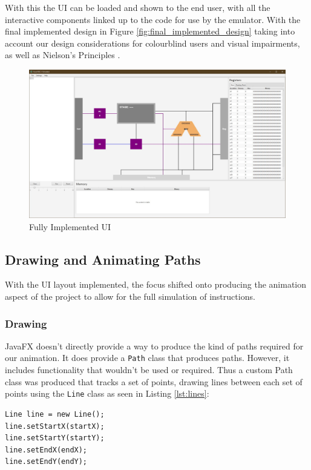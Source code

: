 With this the \ac{UI} can be loaded and shown to the end user, with all the interactive components linked up to the code for use by the emulator. With the final implemented design in Figure \ref{fig:final_implemented_design} taking into account our design considerations for colourblind users and visual impairments, as well as Nielson's Principles \cite{nielsen_2020_10}.

\begin{figure}[H]
    \centering
    \includegraphics[width=\textwidth]{dissertation/DATA/final_design.jpg}
    \caption{Fully Implemented \ac{UI}}
    \label{fig:full_impl_ui}
\end{figure}

\subsection{Drawing and Animating Paths}\label{sec:paths}
With the \ac{UI} layout implemented, the focus shifted onto producing the animation aspect of the project to allow for the full simulation of instructions.

\subsubsection{Drawing}
JavaFX \cite{sunmicrosystems_2022_javafx} doesn't directly provide a way to produce the kind of paths required for our animation. It does provide a \texttt{Path} class that produces paths. However, it includes functionality that wouldn't be used or required. Thus a custom Path class was produced that tracks a set of points, drawing lines between each set of points using the \texttt{Line} class as seen in Listing \ref{lst:lines}:
\begin{lstlisting}[caption={Example usage of the Line class}, label=lst:lines]
Line line = new Line();
line.setStartX(startX);
line.setStartY(startY);
line.setEndX(endX);
line.setEndY(endY);
\end{lstlisting}

